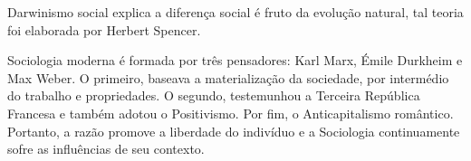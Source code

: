 Darwinismo social explica a diferença social é fruto da evolução natural, tal teoria foi elaborada por Herbert Spencer.

Sociologia moderna é formada por três pensadores: Karl Marx, Émile Durkheim e Max Weber. 
O primeiro, baseava a materialização da sociedade, por intermédio do trabalho e propriedades.
O segundo, testemunhou a Terceira República Francesa e também adotou o Positivismo. 
Por fim, o  Anticapitalismo romântico.
Portanto, a razão promove a liberdade do indivíduo e a Sociologia continuamente sofre as influências de seu contexto.
